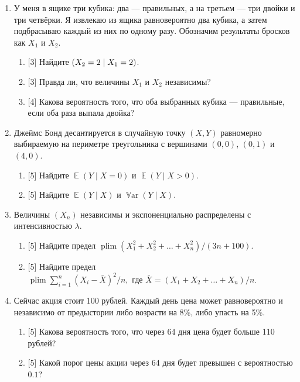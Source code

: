 \documentclass[12pt]{article}
\DeclareMathOperator{\Var}{\mathbb{V}ar}
\DeclareMathOperator{\plim}{plim}
\let\P\relax
\DeclareMathOperator{\P}{\mathbb{P}}
\DeclareMathOperator{\E}{\mathbb{E}}
\begin{document}
\begin{enumerate}
\item У меня в ящике три кубика: два — правильных, а на третьем — три двойки и три четвёрки. 
Я извлекаю из ящика равновероятно два кубика, а затем подбрасываю каждый из них по одному разу. 
Обозначим результаты бросков как $X_1$ и $X_2$.
\begin{enumerate}
    \item {[3]} Найдите $\P(X_2 = 2 \mid X_1 = 2)$. 
    \item {[3]} Правда ли, что величины $X_1$ и $X_2$ независимы?
    \item {[4]} Какова вероятность того, что оба выбранных кубика — правильные, если оба раза выпала двойка?
\end{enumerate}


\item Джеймс Бонд десантируется в случайную точку $(X, Y)$ равномерно выбираемую на периметре треугольника 
с вершинами $(0, 0)$, $(0, 1)$ и $(4, 0)$.

\begin{enumerate}
    \item {[5]} Найдите $\E(Y \mid X = 0)$ и $\E(Y \mid X > 0)$.
    \item {[5]} Найдите $\E(Y \mid X)$ и $\Var(Y \mid X)$.
\end{enumerate}

\item Величины $(X_n)$ независимы и экспоненциально распределены с интенсивностью $\lambda$.

\begin{enumerate}
  \item {[5]} Найдите предел 
  $\plim (X_1^2 + X_2^2 + \dots + X_n^2)/(3n + 100)$.
  \item {[5]} Найдите предел 
  $\plim \sum_{i=1}^n(X_i - \bar X)^2 / n, \text{ где } \bar X = (X_1 + X_2 + \dots + X_n) / n$.
\end{enumerate}

\item  Сейчас акция стоит 100 рублей. 
Каждый день цена может равновероятно и независимо от предыстории либо возрасти на 8\%, либо упасть на 5\%.
\begin{enumerate}
\item {[5]} Какова вероятность того, что через 64 дня цена будет больше 110 рублей?
\item {[5]} Какой порог цены акции через 64 дня будет превышен с вероятностью $0.1$?
\end{enumerate}


\end{enumerate}
\end{document}
